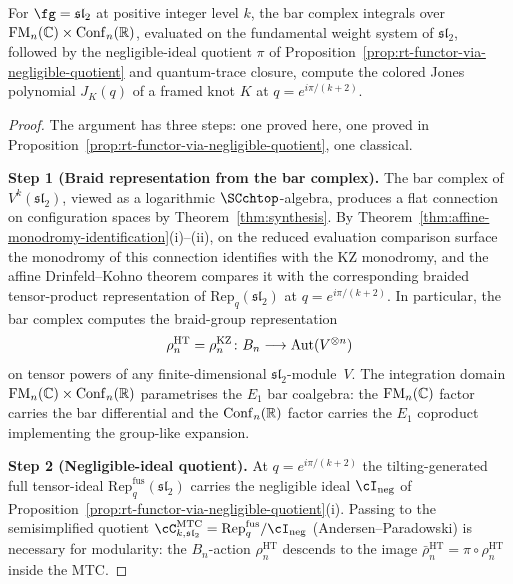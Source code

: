 \begin{corollary}
\label{cor:jones-polynomial}
For $\fg = \mathfrak{sl}_2$ at positive integer level $k$, the bar complex integrals over $\mathrm{FM}_n(\mathbb C) \times \mathrm{Conf}_n(\mathbb R)$, evaluated on the fundamental weight system of $\mathfrak{sl}_2$, followed by the negligible-ideal quotient $\pi$ of Proposition~\ref{prop:rt-functor-via-negligible-quotient} and quantum-trace closure, compute the colored Jones polynomial $J_K(q)$ of a framed knot $K$ at $q = e^{i\pi/(k+2)}$.
\end{corollary}

\begin{proof}
The argument has three steps: one proved here, one proved in Proposition~\ref{prop:rt-functor-via-negligible-quotient}, one classical.

\medskip
\noindent\textbf{Step 1 (Braid representation from the bar complex).}
The bar complex of $V^k(\mathfrak{sl}_2)$, viewed as a logarithmic $\SCchtop$-algebra, produces a flat connection on configuration spaces by Theorem~\ref{thm:synthesis}. By Theorem~\ref{thm:affine-monodromy-identification}(i)--(ii), on the reduced evaluation comparison surface the monodromy of this connection identifies with the KZ monodromy, and the affine Drinfeld--Kohno theorem compares it with the corresponding braided tensor-product representation of $\mathrm{Rep}_q(\mathfrak{sl}_2)$ at $q = e^{i\pi/(k+2)}$. In particular, the bar complex computes the braid-group representation
\[
 \rho_n^{\mathrm{HT}} = \rho_n^{\mathrm{KZ}} \colon B_n \longrightarrow \mathrm{Aut}(V^{\otimes n})
\]
on tensor powers of any finite-dimensional $\mathfrak{sl}_2$-module~$V$. The integration domain $\mathrm{FM}_n(\mathbb C) \times \mathrm{Conf}_n(\mathbb R)$ parametrises the $E_1$ bar coalgebra: the $\mathrm{FM}_n(\mathbb C)$ factor carries the bar differential and the $\mathrm{Conf}_n(\mathbb R)$ factor carries the $E_1$ coproduct implementing the group-like expansion.

\medskip
\noindent\textbf{Step 2 (Negligible-ideal quotient).}
At $q = e^{i\pi/(k+2)}$ the tilting-generated full tensor-ideal $\mathrm{Rep}_q^{\mathrm{fus}}(\mathfrak{sl}_2)$ carries the negligible ideal $\cI_{\mathrm{neg}}$ of Proposition~\ref{prop:rt-functor-via-negligible-quotient}(i). Passing to the semisimplified quotient $\cC^{\mathrm{MTC}}_{k,\mathfrak{sl}_2} = \mathrm{Rep}_q^{\mathrm{fus}}/\cI_{\mathrm{neg}}$ (Andersen--Paradowski) is necessary for modularity: the $B_n$-action $\rho_n^{\mathrm{HT}}$ descends to the image $\bar\rho_n^{\mathrm{HT}} = \pi \circ \rho_n^{\mathrm{HT}}$ inside the MTC.


\end{proof}
